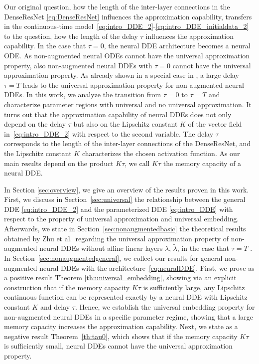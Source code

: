 \documentclass[10pt]{article}
\numberwithin{equation}{section}
\begin{document}
	Our original question, how the length of the inter-layer connections in the DenseResNet \eqref{eq:DenseResNet} influences the approximation capability, transfers in the continuous-time model~\eqref{eq:intro_DDE_2}-\eqref{eq:intro_DDE_initialdata_2} to the question, how the length of the delay $\tau$ influences the approximation capability. In the case that $\tau = 0$, the neural DDE architecture becomes a neural ODE. As non-augmented neural ODEs cannot have the universal approximation property, also non-augmented neural DDEs with $\tau = 0$ cannot have the universal approximation property. As already shown in a special case in \cite{Zhu2021}, a large delay $\tau = T$  leads to the universal approximation property for non-augmented neural DDEs. In this work, we analyze the transition from $\tau = 0$ to $\tau = T$ and characterize parameter regions with universal and no universal approximation. It turns out that the approximation capability of neural DDEs does not only depend on the delay $\tau$ but also on the Lipschitz constant $K$ of the vector field in~\eqref{eq:intro_DDE_2} with respect to the second variable. The delay $\tau$ corresponds to the length of the inter-layer connections of the DenseResNet, and the Lipschitz constant $K$ characterizes the chosen activation function. As our main results depend on the product $K \tau$, we call $K\tau$ the memory capacity of a neural DDE. 
	
	In Section \ref{sec:overview}, we give an overview of the results proven in this work. First, we discuss in Section~\ref{sec:universal} the relationship between the general DDE \eqref{eq:intro_DDE_2} and the parameterized DDE \eqref{eq:intro_DDE} with respect to the property of universal approximation and universal embedding. Afterwards, we state in Section~\ref{sec:nonaugmentedbasic} the theoretical results obtained by Zhu et al.\ regarding the universal approximation property of non-augmented neural DDEs without affine linear layers $\lambda$, $\tilde \lambda$, in the case that $\tau = T$ \cite{Zhu2021}. In Section~\ref{sec:nonaugmentedgeneral}, we collect our results for general non-augmented neural DDEs with the architecture~\eqref{eq:neuralDDE}. First, we prove as a positive result Theorem \ref{th:universal_embedding}, showing via an explicit construction that if the memory capacity $K\tau$ is sufficiently large, any Lipschitz continuous function can be represented exactly by a neural DDE with Lipschitz constant $K$ and delay $\tau$. Hence, we establish the universal embedding property for non-augmented neural DDEs in a specific parameter regime, showing that a large memory capacity increases the approximation capability. Next, we state as a negative result Theorem~\ref{th:tau0}, which shows that if the memory capacity $K\tau$ is sufficiently small, neural DDEs cannot have the universal approximation property. 
	
\end{document}
